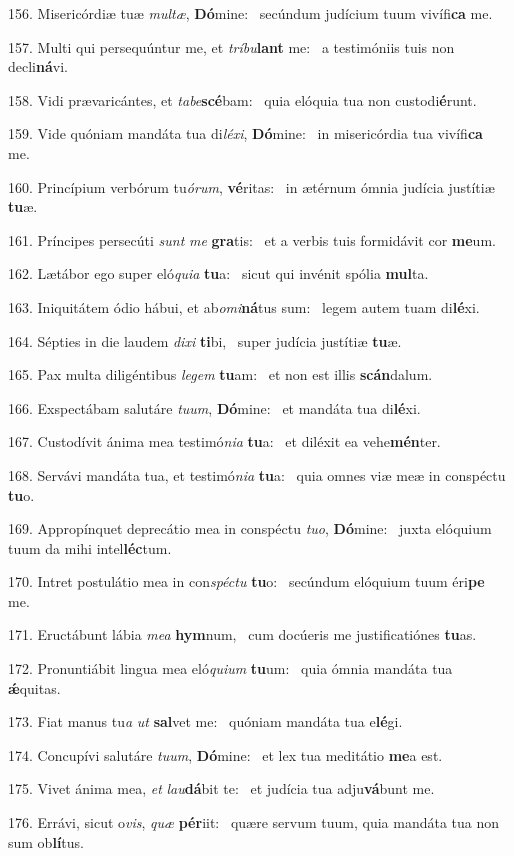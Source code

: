156. Misericórdiæ tuæ \textit{mul}\textit{tæ}, \textbf{Dó}mine: \ast\  secúndum judícium tuum vivífi\textbf{ca} me.\

157. Multi qui persequúntur me, et \textit{trí}\textit{bu}\textbf{lant} me: \ast\  a testimóniis tuis non decli\textbf{ná}vi.\

158. Vidi prævaricántes, et \textit{ta}\textit{be}\textbf{scé}bam: \ast\  quia elóquia tua non custodi\textbf{é}runt.\

159. Vide quóniam mandáta tua di\textit{lé}\textit{xi}, \textbf{Dó}mine: \ast\  in misericórdia tua vivífi\textbf{ca} me.\

160. Princípium verbórum tu\textit{ó}\textit{rum}, \textbf{vé}ritas: \ast\  in ætérnum ómnia judícia justítiæ \textbf{tu}æ.\

161. Príncipes persecúti \textit{sunt} \textit{me} \textbf{gra}tis: \ast\  et a verbis tuis formidávit cor \textbf{me}um.\

162. Lætábor ego super eló\textit{qui}\textit{a} \textbf{tu}a: \ast\  sicut qui invénit spólia \textbf{mul}ta.\

163. Iniquitátem ódio hábui, et ab\textit{o}\textit{mi}\textbf{ná}tus sum: \ast\  legem autem tuam di\textbf{lé}xi.\

164. Sépties in die laudem \textit{di}\textit{xi} \textbf{ti}bi, \ast\  super judícia justítiæ \textbf{tu}æ.\

165. Pax multa diligéntibus \textit{le}\textit{gem} \textbf{tu}am: \ast\  et non est illis \textbf{scán}dalum.\

166. Exspectábam salutáre \textit{tu}\textit{um}, \textbf{Dó}mine: \ast\  et mandáta tua di\textbf{lé}xi.\

167. Custodívit ánima mea testimó\textit{ni}\textit{a} \textbf{tu}a: \ast\  et diléxit ea vehe\textbf{mén}ter.\

168. Servávi mandáta tua, et testimó\textit{ni}\textit{a} \textbf{tu}a: \ast\  quia omnes viæ meæ in conspéctu \textbf{tu}o.\

169. Appropínquet deprecátio mea in conspéctu \textit{tu}\textit{o}, \textbf{Dó}mine: \ast\  juxta elóquium tuum da mihi intel\textbf{léc}tum.\

170. Intret postulátio mea in con\textit{spéc}\textit{tu} \textbf{tu}o: \ast\  secúndum elóquium tuum éri\textbf{pe} me.\

171. Eructábunt lábia \textit{me}\textit{a} \textbf{hym}num, \ast\  cum docúeris me justificatiónes \textbf{tu}as.\

172. Pronuntiábit lingua mea eló\textit{qui}\textit{um} \textbf{tu}um: \ast\  quia ómnia mandáta tua \textbf{ǽ}quitas.\

173. Fiat manus tu\textit{a} \textit{ut} \textbf{sal}vet me: \ast\  quóniam mandáta tua e\textbf{lé}gi.\

174. Concupívi salutáre \textit{tu}\textit{um}, \textbf{Dó}mine: \ast\  et lex tua meditátio \textbf{me}a est.\

175. Vivet ánima mea, \textit{et} \textit{lau}\textbf{dá}bit te: \ast\  et judícia tua adju\textbf{vá}bunt me.\

176. Errávi, sicut o\textit{vis}, \textit{quæ} \textbf{pér}iit: \ast\  quære servum tuum, quia mandáta tua non sum ob\textbf{lí}tus.\

